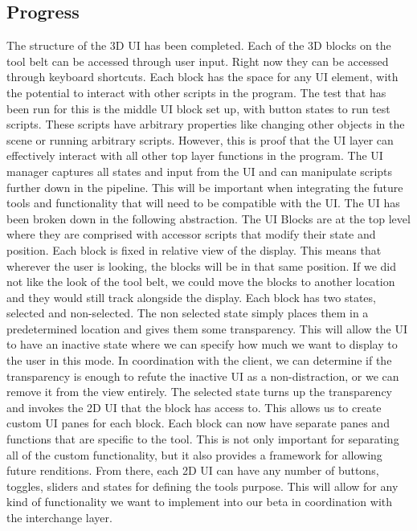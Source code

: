 \documentclass[onecolumn, draftclsnofoot,10pt, compsoc]{IEEEtran}
\begin{document}
\subsection{Progress}
The structure of the 3D UI has been completed. Each of the 3D blocks on the tool belt can be accessed through user input. Right now they can be accessed through keyboard shortcuts. Each block has the space for any UI element, with the potential to interact with other scripts in the program. The test that has been run for this is the middle UI block set up, with button states to run test scripts. These scripts have arbitrary properties like changing other objects in the scene or running arbitrary scripts. However, this is proof that the UI layer can effectively interact with all other top layer functions in the program. The UI manager captures all states and input from the UI and can manipulate scripts further down in the pipeline. This will be important when integrating the future tools and functionality that will need to be compatible with the UI. 
The UI has been broken down in the following abstraction. The UI Blocks are at the top level where they are comprised with accessor scripts that modify their state and position. Each block is fixed in relative view of the display. This means that wherever the user is looking, the blocks will be in that same position. If we did not like the look of the tool belt, we could move the blocks to another location and they would still track alongside the display. Each block has two states, selected and non-selected. The non selected state simply places them in a predetermined location and gives them some transparency. This will allow the UI to have an inactive state where we can specify how much we want to display to the user in this mode. In coordination with the client, we can determine if the transparency is enough to refute the inactive UI as a non-distraction, or we can remove it from the view entirely. The selected state turns up the transparency and invokes the 2D UI that the block has access to. This allows us to create custom UI panes for each block. Each block can now have separate panes and functions that are specific to the tool. This is not only important for separating all of the custom functionality, but it also provides a framework for allowing future renditions. From there, each 2D UI can have any number of buttons, toggles, sliders and states for defining the tools purpose. This will allow for any kind of functionality we want to implement into our beta in coordination with the interchange layer.
\end{document}
